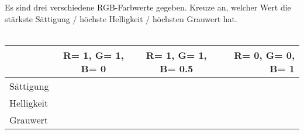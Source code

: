 \documentclass[../../main.tex]{subfiles}
\begin{document}
Es sind drei verschiedene RGB-Farbwerte gegeben. Kreuze an, welcher Wert die stärkste Sättigung / höchste Helligkeit / höchsten Grauwert hat. \\ \\

\begin{tabular}[h]{l|c|c|r}
 & R= 1, G= 1, B= 0 & R= 1, G= 1, B= 0.5 & R= 0, G= 0, B= 1 \\
\hline
Sättigung &  &  \\
\hline
Helligkeit &  &  \\
\hline
Grauwert &  &  \\
\end{tabular}
\end{document}
